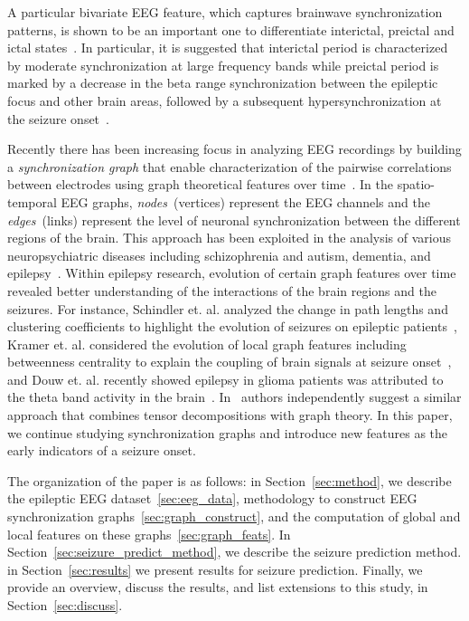 \documentclass{article} %
\begin{document}
A particular bivariate EEG feature, which captures  brainwave synchronization patterns, is shown to be an important one to differentiate interictal, preictal and ictal states~\cite{vanquyen_ictogenesis,levan_preictal}.  In particular, it is  suggested that interictal period is characterized by moderate synchronization at large frequency bands while  preictal period is marked by a decrease in the beta range synchronization between the epileptic focus and other brain areas, followed by a subsequent hypersynchronization at the seizure onset~\cite{mirowski_seizure_prediction_classification}.

Recently there has been increasing focus in analyzing EEG recordings by building a {\em synchronization graph} that enable characterization of the pairwise correlations between electrodes using graph theoretical features over time~\cite{bullmore2009complex,stam2012organization}.  In the spatio-temporal EEG  graphs, {\em nodes}~(vertices) represent the EEG channels and the {\em edges}~(links) represent the level of  neuronal synchronization between the different regions of the brain.  This approach has been exploited in the analysis of various neuropsychiatric diseases including schizophrenia and autism, dementia, and epilepsy~\cite{stam2012organization}.  Within epilepsy research,  evolution  of certain  graph  features over time revealed better understanding of the interactions  of the brain regions and the seizures.  For instance, Schindler et. al. analyzed the change in path lengths and clustering coefficients to highlight the evolution of seizures on epileptic patients~\cite{schindler2008evolving}, Kramer et. al.  considered  the  evolution  of  local graph features including betweenness centrality to explain the coupling of brain signals at seizure onset~\cite{kramer2008emergent}, and Douw et. al. recently showed epilepsy in glioma patients was attributed to the theta band activity in the brain~\cite{douw2010epilepsy}.  In~\cite{mahyari_tensor_brain} authors independently suggest a similar approach that combines tensor decompositions with graph theory.
In  this paper, we continue studying synchronization graphs  and introduce new features as the early indicators of a seizure onset.

The organization of the paper is as follows: in Section~\ref{sec:method}, we describe the epileptic EEG dataset~\ref{sec:eeg_data}, methodology to construct EEG synchronization graphs~\ref{sec:graph_construct}, and the computation of global and local features on these graphs~\ref{sec:graph_feats}.  In Section~\ref{sec:seizure_predict_method}, we describe the seizure prediction method.  in Section~\ref{sec:results} we present results for seizure prediction.  Finally, we provide an overview, discuss the results, and list extensions to this study, in Section~\ref{sec:discuss}.
\end{document}
